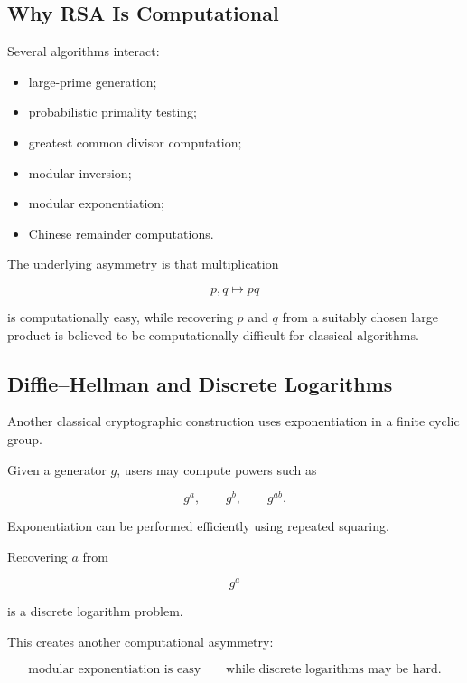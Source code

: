 \subsection{Why RSA Is Computational}
\label{subsec:why-rsa-computational}

Several algorithms interact:

\begin{itemize}
    \item large-prime generation;
    \item probabilistic primality testing;
    \item greatest common divisor computation;
    \item modular inversion;
    \item modular exponentiation;
    \item Chinese remainder computations.
\end{itemize}

The underlying asymmetry is that multiplication

\[ p,q\longmapsto pq \]

is computationally easy, while recovering \(p\) and \(q\) from a suitably
chosen large product is believed to be computationally difficult for
classical algorithms.

\subsection{Diffie--Hellman and Discrete Logarithms}
\label{subsec:diffie-hellman-number-theory}

Another classical cryptographic construction uses exponentiation in a finite
cyclic group.

Given a generator \(g\), users may compute powers such as

\[ g^a,\qquad g^b,\qquad g^{ab}. \]

Exponentiation can be performed efficiently using repeated squaring.

Recovering \(a\) from

\[ g^a \]

is a discrete logarithm problem.

This creates another computational asymmetry:

\[
\boxed{
\text{modular exponentiation is easy}
\qquad
\text{while discrete logarithms may be hard}.
}
\]


